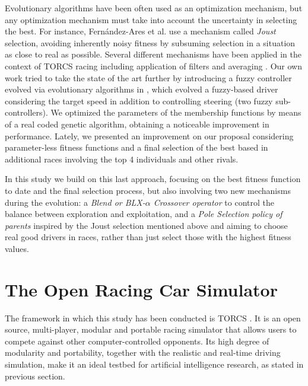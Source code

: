 \documentclass[10pt,journal,compsoc]{IEEEtran}
\begin{document}
Evolutionary algorithms have been often used as an optimization
mechanism, but any optimization mechanism must take into account the
uncertainty in selecting the best. For instance, Fern\'andez-Ares et
al. \cite{DBLP:conf/evoW/Fernandez-AresG16} use a mechanism called
{\em Joust} selection, avoiding inherently noisy fitness by subsuming
selection in a situation as close to real as possible. Several
different mechanisms have been applied in the context of TORCS racing
including application of filters \cite{preuss2011torcs} and averaging
\cite{Shi-DE13}.
Our own work tried to take the state of the art further by introducing
a fuzzy controller evolved via evolutionary algorithms in
\cite{salem_evo18}, which evolved a fuzzy-based driver considering the
target speed in addition to controlling steering (two fuzzy
sub-controllers). We optimized the parameters of the membership functions by means of a real coded genetic algorithm, obtaining a noticeable improvement in
performance. Lately, we presented \cite{salem_cig2018} an improvement on our proposal considering parameter-less fitness functions and a final selection of the best based in additional races involving the top 4 individuals and other rivals.

In this study we build on this last approach, focusing on the best
fitness function to date and the final selection process, but also
involving two new mechanisms during the evolution: a \textit{Blend or BLX-$\alpha$ Crossover operator} to control the balance between exploration and
exploitation, and a \textit{Pole Selection policy of parents} inspired by the
Joust selection mentioned above and aiming to choose real good drivers in races, rather than just select those with the highest fitness values. 



\section{The Open Racing Car Simulator}
\label{sec:torcs}

The framework in which this study has been conducted is TORCS \cite{torcs4}. It is an open source, multi-player, modular and portable racing simulator that allows users to compete against other computer-controlled opponents.
Its high degree of modularity and portability, together with the
realistic and real-time driving simulation, make it an ideal testbed
for artificial intelligence research, as stated in previous section.
\end{document}
